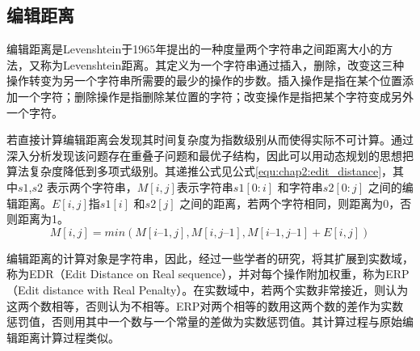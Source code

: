 \subsection{编辑距离}
编辑距离是Levenshtein于1965年提出的一种度量两个字符串之间距离大小的方法，又称为Levenshtein距离。其定义为一个字符串通过插入，删除，改变这三种操作转变为另一个字符串所需要的最少的操作的步数。插入操作是指在某个位置添加一个字符；删除操作是指删除某位置的字符；改变操作是指把某个字符变成另外一个字符。
\par 若直接计算编辑距离会发现其时间复杂度为指数级别从而使得实际不可计算。通过深入分析发现该问题存在重叠子问题和最优子结构，因此可以用动态规划的思想把算法复杂度降低到多项式级别。其递推公式见公式\ref{equ:chap2:edit_distance}，其中$s1$,$s2$ 表示两个字符串，$M[i,j]$表示字符串$s1[0:i]$ 和字符串$s2[0:j]$ 之间的编辑距离。$E[i,j]$指$s1[i]$ 和$s2[j]$ 之间的距离，若两个字符相同，则距离为0，否则距离为1。
\begin{equation}
\label{equ:chap2:edit_distance}
M[i,j] = min(M[i–1,j],M[i,j–1],M[i–1,j–1] + E[i,j])
\end{equation}
\par 编辑距离的计算对象是字符串，因此，经过一些学者的研究，将其扩展到实数域，称为EDR（Edit Distance on Real sequence），并对每个操作附加权重，称为ERP（Edit distance with Real Penalty）。在实数域中，若两个实数非常接近，则认为这两个数相等，否则认为不相等。ERP对两个相等的数用这两个数的差作为实数惩罚值，否则用其中一个数与一个常量的差做为实数惩罚值。其计算过程与原始编辑距离计算过程类似。
